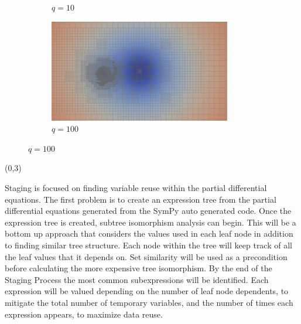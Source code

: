 \documentclass[landscape]{a0poster}
\def\Subhead#1{\noindent{\textbf{\Large\color{DarkBlue} #1}}\medskip}
\begin{document}
\begin{textblock}{30}
\begin{textblock}{29}
\begin{figure}
\begin{subfigure}{0.33\textwidth}
			\caption{\large $q=10$}
		\end{subfigure}
		\begin{subfigure}{0.33\textwidth}
			\includegraphics[width=\textwidth]{../sc18/figs/img_slice_level_r100.png}
			\caption{\large $q=100$}
		\end{subfigure}
	\end{figure}
\end{textblock}


\begin{textblock}{14}(0,3)
	\Subhead{Staging}%

	\vspace{-0.25in}
	Staging is focused on finding variable reuse within the partial differential equations. The first problem is to create an expression tree from the partial differential equations generated from the SymPy auto generated code. 
	Once the expression tree is created, subtree isomorphism analysis can begin. This will be a bottom up approach that considers the values used in each leaf node in addition to finding similar tree structure. Each node within the tree will keep track of all the leaf values that it depends on. Set similarity will be used as a precondition before calculating the more expensive tree isomorphism. By the end of the Staging Process the most common subexpressions will be identified. Each expression will be valued depending on the number of leaf node dependents, to mitigate the total number of temporary variables, and the number of times each expression appears, to maximize data reuse.

	
\end{textblock}

\end{textblock}
\end{document}
